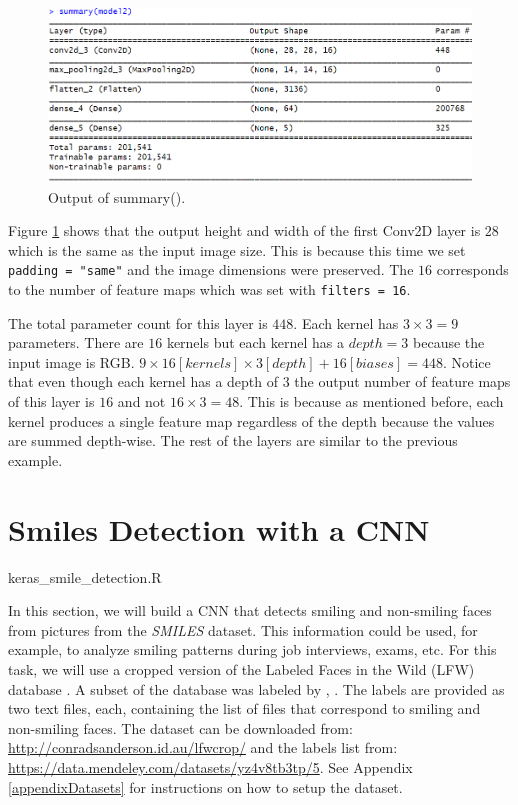 \documentclass[
  11pt,
]{krantz}
\makeatletter
\newenvironment{kframe}{%
\medskip{}
\setlength{\fboxsep}{.8em}
 \def\at@end@of@kframe{}%
 \ifinner\ifhmode%
  \def\at@end@of@kframe{\end{minipage}}%
  \begin{minipage}{\columnwidth}%
 \fi\fi%
 \def\FrameCommand##1{\hskip\@totalleftmargin \hskip-\fboxsep
 \colorbox{shadecolor}{##1}\hskip-\fboxsep
     \hskip-\linewidth \hskip-\@totalleftmargin \hskip\columnwidth}%
 \MakeFramed {\advance\hsize-\width
   \@totalleftmargin\z@ \linewidth\hsize
   \@setminipage}}%
 {\par\unskip\endMakeFramed%
 \at@end@of@kframe}
\newenvironment{rmdblock}[1]
  {
  \begin{itemize}
  \renewcommand{\labelitemi}{
    \raisebox{-.7\height}[0pt][0pt]{
      {\setkeys{Gin}{width=3em,keepaspectratio}\texttt{[image: images/icons/\#1]}}
    }
  }
  \setlength{\fboxsep}{1em}
  \begin{kframe}
  \item
  }
  {
  \end{kframe}
  \end{itemize}
  }
\newenvironment{rmdfolder}
  {\begin{rmdblock}{folder}}
  {\end{rmdblock}}
\makeatother
\begin{document}
\begin{figure}

{\centering \includegraphics[width=0.9\linewidth]{images/cnn_summaryEx2} 

}

\caption{Output of summary().}\label{fig:cnnEx2}
\end{figure}

Figure \ref{fig:cnnEx2} shows that the output height and width of the first Conv2D layer is \(28\) which is the same as the input image size. This is because this time we set \texttt{padding\ =\ "same"} and the image dimensions were preserved. The \(16\) corresponds to the number of feature maps which was set with \texttt{filters\ =\ 16}.

The total parameter count for this layer is \(448\). Each kernel has \(3 \times 3 = 9\) parameters. There are \(16\) kernels but each kernel has a \(depth=3\) because the input image is RGB. \(9 \times 16[kernels] \times 3[depth] + 16[biases] = 448\). Notice that even though each kernel has a depth of \(3\) the output number of feature maps of this layer is \(16\) and not \(16 \times 3 = 48\). This is because as mentioned before, each kernel produces a single feature map regardless of the depth because the values are summed depth-wise. The rest of the layers are similar to the previous example.

\hypertarget{cnnSmile}{%
\section{Smiles Detection with a CNN}\label{cnnSmile}}

\begin{rmdfolder}
keras\_smile\_detection.R
\end{rmdfolder}

In this section, we will build a CNN that detects smiling and non-smiling faces from pictures from the \emph{SMILES} dataset. This information could be used, for example, to analyze smiling patterns during job interviews, exams, etc. For this task, we will use a cropped \citep{sanderson2009multi} version of the Labeled Faces in the Wild (LFW) database \citep{huang2008labeled}. A subset of the database was labeled by \citet{arigbabu2016smile}, \citet{olasimbo}. The labels are provided as two text files, each, containing the list of files that correspond to smiling and non-smiling faces. The dataset can be downloaded from: \url{http://conradsanderson.id.au/lfwcrop/} and the labels list from: \url{https://data.mendeley.com/datasets/yz4v8tb3tp/5}. See Appendix \ref{appendixDatasets} for instructions on how to setup the dataset.
\end{document}
